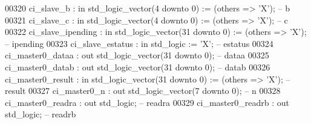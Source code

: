 \begin{DoxyCode}
00320             ci\_slave\_b          : \textcolor{keywordflow}{in}  \textcolor{comment}{std\_logic\_vector}(\textcolor{vhdllogic}{}\textcolor{vhdllogic}{4} \textcolor{keywordflow}{downto} \textcolor{vhdllogic}{}\textcolor{vhdllogic}{0})  := (\textcolor{keywordflow}{others} => 'X'); \textcolor{keyword}{-- b}
00321             ci\_slave\_c          : \textcolor{keywordflow}{in}  \textcolor{comment}{std\_logic\_vector}(\textcolor{vhdllogic}{}\textcolor{vhdllogic}{4} \textcolor{keywordflow}{downto} \textcolor{vhdllogic}{}\textcolor{vhdllogic}{0})  := (\textcolor{keywordflow}{others} => 'X'); \textcolor{keyword}{-- c}
00322             ci\_slave\_ipending   : \textcolor{keywordflow}{in}  \textcolor{comment}{std\_logic\_vector}(\textcolor{vhdllogic}{}\textcolor{vhdllogic}{31} \textcolor{keywordflow}{downto} \textcolor{vhdllogic}{}\textcolor{vhdllogic}{0}) := (\textcolor{keywordflow}{others} => 'X'); \textcolor{keyword}{-- ipending}
00323             ci\_slave\_estatus    : \textcolor{keywordflow}{in}  \textcolor{comment}{std\_logic}                     := 'X';             \textcolor{keyword}{-- estatus}
00324             ci\_master0\_dataa    : \textcolor{keywordflow}{out} \textcolor{comment}{std\_logic\_vector}(\textcolor{vhdllogic}{}\textcolor{vhdllogic}{31} \textcolor{keywordflow}{downto} \textcolor{vhdllogic}{}\textcolor{vhdllogic}{0});                    \textcolor{keyword}{-- dataa}
00325             ci\_master0\_datab    : \textcolor{keywordflow}{out} \textcolor{comment}{std\_logic\_vector}(\textcolor{vhdllogic}{}\textcolor{vhdllogic}{31} \textcolor{keywordflow}{downto} \textcolor{vhdllogic}{}\textcolor{vhdllogic}{0});                    \textcolor{keyword}{-- datab}
00326             ci\_master0\_result   : \textcolor{keywordflow}{in}  \textcolor{comment}{std\_logic\_vector}(\textcolor{vhdllogic}{}\textcolor{vhdllogic}{31} \textcolor{keywordflow}{downto} \textcolor{vhdllogic}{}\textcolor{vhdllogic}{0}) := (\textcolor{keywordflow}{others} => 'X'); \textcolor{keyword}{-- result}
00327             ci\_master0\_n        : \textcolor{keywordflow}{out} \textcolor{comment}{std\_logic\_vector}(\textcolor{vhdllogic}{}\textcolor{vhdllogic}{7} \textcolor{keywordflow}{downto} \textcolor{vhdllogic}{}\textcolor{vhdllogic}{0});                     \textcolor{keyword}{-- n}
00328             ci\_master0\_readra   : \textcolor{keywordflow}{out} \textcolor{comment}{std\_logic};                                        \textcolor{keyword}{-- readra}
00329             ci\_master0\_readrb   : \textcolor{keywordflow}{out} \textcolor{comment}{std\_logic};                                        \textcolor{keyword}{-- readrb}

\end{DoxyCode}
